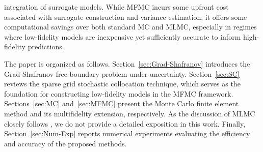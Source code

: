 integration of surrogate models. While MFMC incurs some upfront cost associated with surrogate construction and variance estimation, it offers some computational savings over both standard MC and MLMC, especially in regimes where low-fidelity models are inexpensive yet sufficiently accurate to inform high-fidelity predictions.



The paper is organized as follows. Section~\ref{sec:Grad-Shafranov} introduces the Grad-Shafranov free boundary problem under uncertainty. Section~\ref{sec:SC} reviews the sparse grid stochastic collocation technique, which serves as the foundation for constructing low-fidelity models in the MFMC framework. Sections~\ref{sec:MC} and~\ref{sec:MFMC} present the Monte Carlo finite element method and its multifidelity extension, respectively. As the discussion of MLMC closely follows \cite{ElLiSa:2025}, we do not provide a detailed exposition in this work. Finally, Section~\ref{sec:Num-Exp} reports numerical experiments evaluating the efficiency and accuracy of the proposed methods.

 






